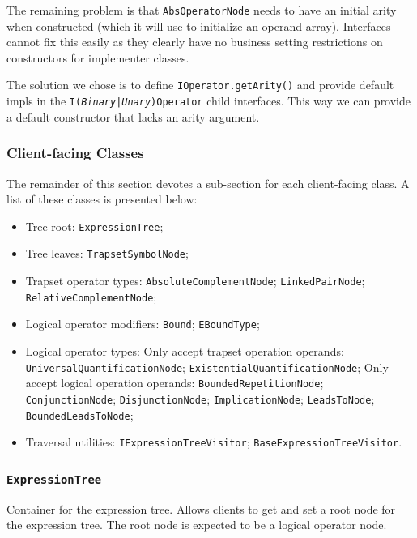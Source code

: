 \documentclass[12pt,oneside,a4paper,notitlepage]{report}
\begin{document}
	\bigskip

	\par The remaining problem is that \texttt{AbsOperatorNode} needs to have an initial arity when constructed (which it will use to initialize an operand array). Interfaces cannot fix this easily as they clearly have no business setting restrictions on constructors for implementer classes.

	\bigskip

	\par The solution we chose is to define \texttt{IOperator.getArity()} and provide default impls in the \texttt{I(\textit{Binary|Unary})Operator} child interfaces. This way we can provide a default constructor that lacks an arity argument.

	\subsubsection*{Client-facing Classes}
	\par The remainder of this section devotes a sub-section for each client-facing class. A list of these classes is presented below:
	\begin{itemize}
		\item Tree root:
		\subitem \texttt{ExpressionTree};
		\item Tree leaves:
		\subitem \texttt{TrapsetSymbolNode};
		\item Trapset operator types:
		\subitem \texttt{AbsoluteComplementNode};
		\subitem \texttt{LinkedPairNode};
		\subitem \texttt{RelativeComplementNode};
		\item Logical operator modifiers:
		\subitem \texttt{Bound};
		\subitem \texttt{EBoundType};
		\item Logical operator types:
		\subitem Only accept trapset operation operands:
		\subsubitem \texttt{UniversalQuantificationNode};
		\subsubitem \texttt{ExistentialQuantificationNode};
		\subitem Only accept logical operation operands:
		\subsubitem \texttt{BoundedRepetitionNode};
		\subsubitem \texttt{ConjunctionNode};
		\subsubitem \texttt{DisjunctionNode};
		\subsubitem \texttt{ImplicationNode};
		\subsubitem \texttt{LeadsToNode};
		\subsubitem \texttt{BoundedLeadsToNode};
		\item Traversal utilities:
		\subitem \texttt{IExpressionTreeVisitor};
		\subitem \texttt{BaseExpressionTreeVisitor}.
	\end{itemize}

	\subsubsection{\texttt{ExpressionTree}}
	\par Container for the expression tree. Allows clients to get and set a root node for the expression tree. The root node is expected to be a logical operator node.
\end{document}
